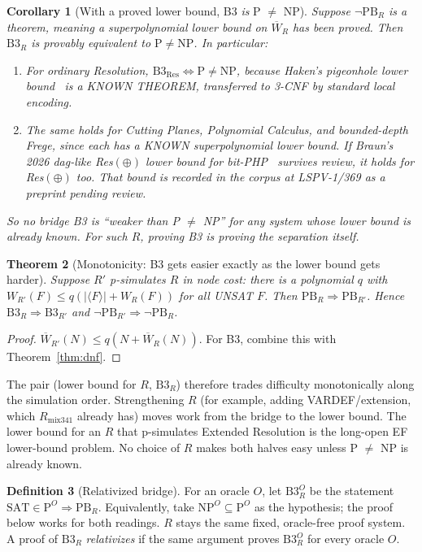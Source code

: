 \documentclass[11pt]{article}
\newtheorem{theorem}{Theorem}
\newtheorem{corollary}[theorem]{Corollary}
\theoremstyle{definition}
\newtheorem{definition}[theorem]{Definition}
\begin{document}
\begin{corollary}[With a proved lower bound, B3 \emph{is} P $\ne$ NP]\label{cor:known}
Suppose $\neg\mathrm{PB}_R$ is a theorem, meaning a superpolynomial lower bound on
$\overline W_R$ has been proved. Then $\mathrm{B3}_R$ is provably equivalent to
$\mathrm P\ne\mathrm{NP}$. In particular:
\begin{enumerate}
\item For ordinary Resolution, $\mathrm{B3}_{\mathrm{Res}}\iff\mathrm P\ne\mathrm{NP}$,
because Haken's pigeonhole lower bound~\cite{Haken85} is a KNOWN THEOREM, transferred to
3-CNF by standard local encoding.
\item The same holds for Cutting Planes, Polynomial Calculus, and bounded-depth Frege,
since each has a KNOWN superpolynomial lower bound. If Braun's 2026 dag-like
Res$(\oplus)$ lower bound for bit-PHP~\cite{Braun26} survives review, it holds for
Res$(\oplus)$ too. That bound is recorded in the corpus at LSPV-1/369 as a preprint
pending review.
\end{enumerate}
So no bridge B3 is ``weaker than P $\ne$ NP'' for any system whose lower bound is
already known. For such $R$, proving B3 is proving the separation itself.
\end{corollary}

\begin{theorem}[Monotonicity: B3 gets easier exactly as the lower bound gets harder]\label{thm:mono}
Suppose $R'$ p-simulates $R$ in node cost: there is a polynomial $q$ with
$W_{R'}(F)\le q(|\langle F\rangle|+W_R(F))$ for all UNSAT $F$. Then
$\mathrm{PB}_R\Rightarrow\mathrm{PB}_{R'}$. Hence
$\mathrm{B3}_R\Rightarrow\mathrm{B3}_{R'}$ and $\neg\mathrm{PB}_{R'}\Rightarrow\neg\mathrm{PB}_R$.
\end{theorem}
\begin{proof}
$\overline W_{R'}(N)\le q(N+\overline W_R(N))$. For B3, combine this with
Theorem~\ref{thm:dnf}.
\end{proof}

\noindent The pair (lower bound for $R$, $\mathrm{B3}_R$) therefore trades difficulty
monotonically along the simulation order. Strengthening $R$ (for example, adding
VARDEF/extension, which $R_{\mathrm{mix341}}$ already has) moves work from the bridge to
the lower bound. The lower bound for an $R$ that p-simulates Extended Resolution is the
long-open EF lower-bound problem. No choice of $R$ makes both halves easy unless
P $\ne$ NP is already known.

\begin{definition}[Relativized bridge]
For an oracle $O$, let $\mathrm{B3}^O_R$ be the statement
$\mathrm{SAT}\in\mathrm P^O\Rightarrow\mathrm{PB}_R$. Equivalently, take
$\mathrm{NP}^O\subseteq\mathrm P^O$ as the hypothesis; the proof below works for both
readings. $R$ stays the same fixed, oracle-free proof system. A proof of $\mathrm{B3}_R$
\emph{relativizes} if the same argument proves $\mathrm{B3}^O_R$ for every oracle $O$.
\end{definition}
\end{document}
